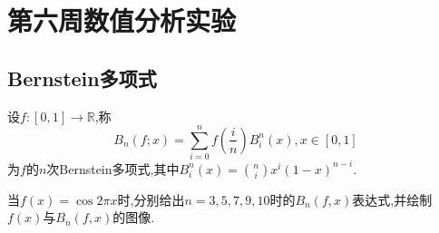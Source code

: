 \section{第六周数值分析实验}
\subsection{Bernstein多项式}
\begin{definition}
	设$f:[0,1]\to\mathbb{R}$,称
	$$
	B_n(f;x)=\sum_{i=0}^{n}f\left(\frac{i}{n}\right)B_i^n(x),x\in[0,1]
	$$
	为$f$的$n$次Bernstein多项式,其中$B_i^n(x)=\binom{n}{i}x^i(1-x)^{n-i}$.
\end{definition}

\begin{ex}
	当$f(x)=\cos 2\pi x$时,分别给出$n=3, 5, 7, 9, 10$时的$B_n(f,x)$表达式,并绘制$f(x)$与$B_n(f,x)$的图像.
\end{ex}

\qa 

